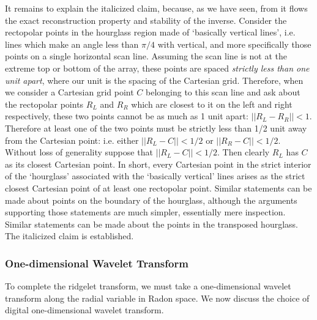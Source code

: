 It remains to explain the italicized claim, because, as we have seen,
from it flows the exact reconstruction property and stability of the
inverse. Consider the rectopolar points in the hourglass region made of
`basically vertical lines', i.e. lines which make an angle
less than $\pi/4$ with vertical, and more specifically those
points on a single horizontal scan line. Assuming the scan line
is not at the extreme top or bottom of the array, these points are spaced {\it
strictly less than one unit apart}, where our unit is the spacing of 
the Cartesian
grid. Therefore, when we consider a Cartesian grid point $C$ belonging to this
scan line and ask about the rectopolar points $R_L$ and $R_R$ which 
are closest to
it on the left and right respectively, these two points cannot be as much as 1
unit apart:
$|| R_L - R_R || < 1$. Therefore at least one of the two points must be
strictly less than 1/2 unit away from the Cartesian point: i.e. either
$|| R_L - C || < 1/2$ or $|| R_R - C || < 1/2$. Without loss of
generality suppose that $|| R_L - C || < 1/2$. Then clearly $R_L$ has
$C$ as its closest Cartesian point. In short, every Cartesian point in
the strict interior of the `hourglass' associated with the `basically
vertical' lines arises as the strict closest Cartesian point of at
least one rectopolar point. Similar statements can be made about points
on the boundary of the hourglass, although the arguments supporting
those statements are much simpler, essentially mere inspection. Similar
statements can be made about the points in the transposed hourglass.
The italicized claim is established.


\subsubsection{One-dimensional Wavelet Transform}

To complete the ridgelet transform, we must take
a one-dimensional wavelet transform along the
radial variable in Radon space. We now discuss the choice of
digital one-dimensional wavelet transform.

